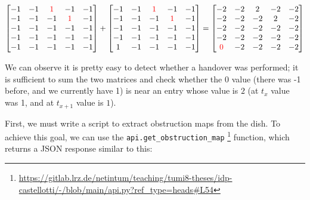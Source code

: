 \documentclass[]{report}
\begin{document}
$\begin{bmatrix}
-1 & -1 & \color{red}1 &           -1 & -1 \\
-1 & -1 &           -1 & \color{red}1 & -1 \\
-1 & -1 &           -1 &           -1 & -1 \\
-1 & -1 &           -1 &           -1 & -1 \\
-1 & -1 &           -1 &           -1 & -1 \\
\end{bmatrix}
+
\begin{bmatrix}
-1 & -1 & \color{red}1 &           -1 & -1 \\
-1 & -1 &           -1 & \color{red}1 & -1 \\
-1 & -1 &           -1 &           -1 & -1 \\
-1 & -1 &           -1 &           -1 & -1 \\
1 & -1 &            -1 &           -1 & -1 \\
\end{bmatrix}
=
\begin{bmatrix}
          -2 & -2 & 2 & -2 & -2 \\
          -2 & -2 & -2 & 2 & -2 \\
          -2 & -2 & -2 & -2 & -2 \\
          -2 & -2 & -2 & -2 & -2 \\
\color{red}0 & -2 & -2 & -2 & -2 \\
\end{bmatrix}$

\vspace{10mm}

We can observe it is pretty easy to detect whether a handover was performed; it is sufficient to sum the two matrices
and check whether the $ 0 $ value (there was -1 before, and we currently have 1) is near an entry whose value is $ 2 $
(at $ t_{x} $ value was 1, and at $ t_{x+1} $ value is $ 1 $). 

First, we must write a script to extract obstruction maps from the dish. To achieve this goal, we can use the
\texttt{api.get\_obstruction\_map}
\footnote{\url{https://gitlab.lrz.de/netintum/teaching/tumi8-theses/idp-castellotti/-/blob/main/api.py?ref_type=heads\#L54}}
function, which returns a JSON response similar to this:
\end{document}
